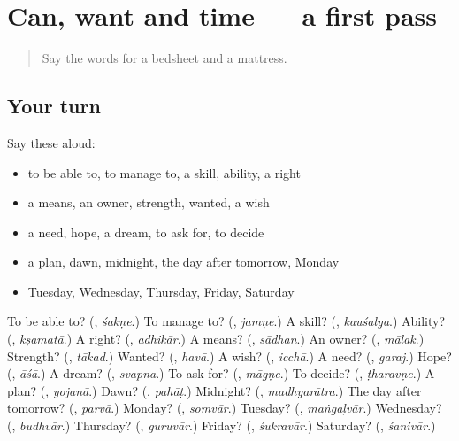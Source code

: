 \section[(dialogue)]{Can, want and time — a first pass}

\label{lesson:MR-R130-first-pass-can-want-and-time}



\begin{quote}
Say the words for a bedsheet and a mattress.
\end{quote}

\subsection*{Your turn}
Say these aloud:

\begin{itemize}
\raggedright
  \item to be able to, to manage to, a skill, ability, a right
  \item a means, an owner, strength, wanted, a wish
  \item a need, hope, a dream, to ask for, to decide
  \item a plan, dawn, midnight, the day after tomorrow, Monday
  \item Tuesday, Wednesday, Thursday, Friday, Saturday
\end{itemize}

\begin{tcolorbox}[breakable,colback=teal!4,colframe=teal!35!black,title={Before you move on}]
To be able to? (\textbf{}, \emph{śakṇe}.) To manage to? (\textbf{}, \emph{jamṇe}.) A skill? (\textbf{}, \emph{kauśalya}.) Ability? (\textbf{}, \emph{kṣamatā}.) A right? (\textbf{}, \emph{adhikār}.) A means? (\textbf{}, \emph{sādhan}.) An owner? (\textbf{}, \emph{mālak}.) Strength? (\textbf{}, \emph{tākad}.) Wanted? (\textbf{}, \emph{havā}.) A wish? (\textbf{}, \emph{icchā}.) A need? (\textbf{}, \emph{garaj}.) Hope? (\textbf{}, \emph{āśā}.) A dream? (\textbf{}, \emph{svapna}.) To ask for? (\textbf{}, \emph{māgṇe}.) To decide? (\textbf{}, \emph{ṭharavṇe}.) A plan? (\textbf{}, \emph{yojanā}.) Dawn? (\textbf{}, \emph{pahāṭ}.) Midnight? (\textbf{}, \emph{madhyarātra}.) The day after tomorrow? (\textbf{}, \emph{parvā}.) Monday? (\textbf{}, \emph{somvār}.) Tuesday? (\textbf{}, \emph{maṅgaḷvār}.) Wednesday? (\textbf{}, \emph{budhvār}.) Thursday? (\textbf{}, \emph{guruvār}.) Friday? (\textbf{}, \emph{śukravār}.) Saturday? (\textbf{}, \emph{śanivār}.)
\end{tcolorbox}

